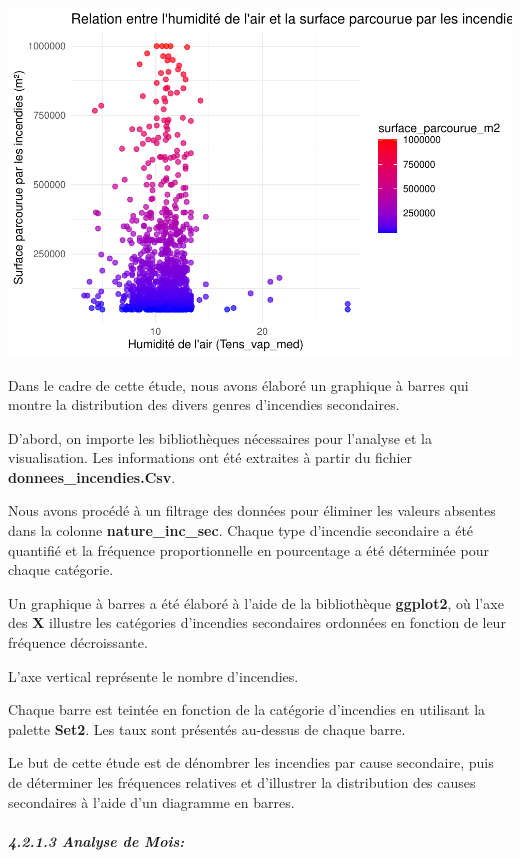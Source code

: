 \documentclass[
]{article}
\begin{document}
\includegraphics{Rapport_files/figure-latex/unnamed-chunk-2-1.pdf}

Dans le cadre de cette étude, nous avons élaboré un graphique à barres
qui montre la distribution des divers genres d'incendies secondaires.

D'abord, on importe les bibliothèques nécessaires pour l'analyse et la
visualisation. Les informations ont été extraites à partir du fichier
\textbf{donnees\_incendies.Csv}.

Nous avons procédé à un filtrage des données pour éliminer les valeurs
absentes dans la colonne \textbf{nature\_inc\_sec}. Chaque type
d'incendie secondaire a été quantifié et la fréquence proportionnelle en
pourcentage a été déterminée pour chaque catégorie.

Un graphique à barres a été élaboré à l'aide de la bibliothèque
\textbf{ggplot2}, où l'axe des \textbf{X} illustre les catégories
d'incendies secondaires ordonnées en fonction de leur fréquence
décroissante.

L'axe vertical représente le nombre d'incendies.

Chaque barre est teintée en fonction de la catégorie d'incendies en
utilisant la palette \textbf{Set2}. Les taux sont présentés au-dessus de
chaque barre.

Le but de cette étude est de dénombrer les incendies par cause
secondaire, puis de déterminer les fréquences relatives et d'illustrer
la distribution des causes secondaires à l'aide d'un diagramme en
barres.

\subparagraph{4.2.1.3 Analyse de Mois:}\label{analyse-de-mois}
\end{document}
